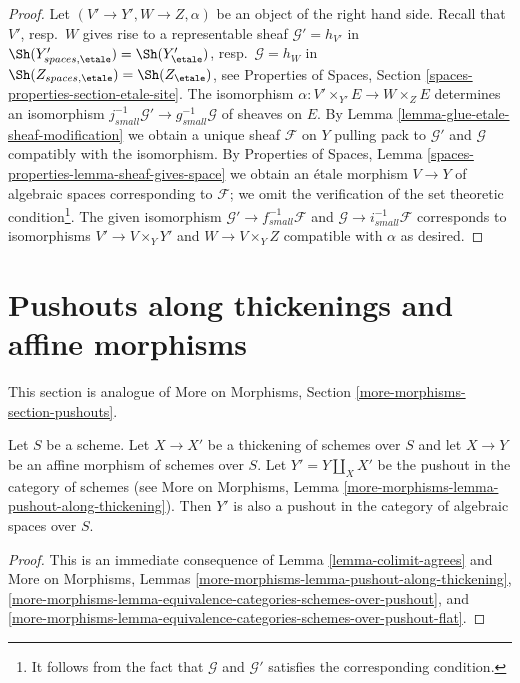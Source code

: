 \begin{proof}
Let $(V' \to Y', W \to Z, \alpha)$ be an object of the right hand side.
Recall that $V'$, resp.\ $W$ gives rise to a representable sheaf
$\mathcal{G}' = h_{V'}$ in $\Sh(Y'_{spaces, \etale}) = \Sh(Y'_\etale)$,
resp.\ $\mathcal{G} = h_W$ 
in $\Sh(Z_{spaces, \etale}) = \Sh(Z_\etale)$, see
Properties of Spaces, Section \ref{spaces-properties-section-etale-site}.
The isomorphism $\alpha : V' \times_{Y'} E \to W \times_Z E$
determines an isomorphism
$j_{small}^{-1}\mathcal{G}' \to g_{small}^{-1}\mathcal{G}$ of
sheaves on $E$.
By Lemma \ref{lemma-glue-etale-sheaf-modification}
we obtain a unique sheaf $\mathcal{F}$ on $Y$ pulling pack
to $\mathcal{G}'$ and $\mathcal{G}$ compatibly with the isomorphism.
By Properties of Spaces, Lemma \ref{spaces-properties-lemma-sheaf-gives-space}
we obtain an \'etale morphism $V \to Y$ of algebraic spaces
corresponding to $\mathcal{F}$; we omit the verification of
the set theoretic condition\footnote{It follows from the
fact that $\mathcal{G}$ and $\mathcal{G}'$ satisfies the
corresponding condition.}.
The given isomorphism $\mathcal{G}' \to f_{small}^{-1}\mathcal{F}$
and $\mathcal{G} \to i_{small}^{-1}\mathcal{F}$
corresponds to isomorphisms $V' \to V \times_Y Y'$
and $W \to V \times_Y Z$ compatible
with $\alpha$ as desired.
\end{proof}









\section{Pushouts along thickenings and affine morphisms}
\label{section-pushouts}

\noindent
This section is analogue of
More on Morphisms, Section \ref{more-morphisms-section-pushouts}.

\begin{lemma}
\label{lemma-pushout-along-thickening-schemes}
Let $S$ be a scheme. Let $X \to X'$ be a thickening of schemes
over $S$ and let $X \to Y$ be an affine morphism of schemes over $S$.
Let $Y' = Y \amalg_X X'$ be the pushout in the category of schemes (see
More on Morphisms, Lemma \ref{more-morphisms-lemma-pushout-along-thickening}).
Then $Y'$ is also a pushout in the category of algebraic spaces over $S$.
\end{lemma}

\begin{proof}
This is an immediate consequence of Lemma \ref{lemma-colimit-agrees} and
More on Morphisms, Lemmas
\ref{more-morphisms-lemma-pushout-along-thickening},
\ref{more-morphisms-lemma-equivalence-categories-schemes-over-pushout}, and
\ref{more-morphisms-lemma-equivalence-categories-schemes-over-pushout-flat}.
\end{proof}

